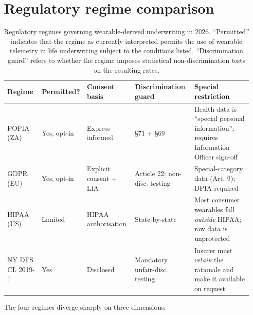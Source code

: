 \documentclass[11pt,a4paper]{article}
\let\origsection\section
\renewcommand{\section}{\clearpage\origsection}
\theoremstyle{ia}
\newcommand{\1}{\mathbf{1}}
\begin{document}
\section{Regulatory regime comparison}\label{sec:regulatory}

\begin{table}[ht]
\centering\footnotesize
\caption{Regulatory regimes governing wearable-derived underwriting
in 2026. ``Permitted'' indicates that the regime as currently
interpreted permits the use of wearable telemetry in life
underwriting subject to the conditions listed. ``Discrimination
guard'' refers to whether the regime imposes statistical
non-discrimination tests on the resulting rates.}\label{tab:regulatory}
\setlength{\tabcolsep}{4pt}
\begin{tabular}{p{2.4cm}p{2.4cm}p{2.4cm}p{2.4cm}p{3.0cm}}
\toprule
Regime & Permitted? & Consent basis & Discrimination guard & Special restriction \\
\midrule
POPIA (ZA)         & Yes, opt-in    & Express informed
                                    & §71 + §69
                                    & Health data is ``special personal information'';
                                      requires Information Officer sign-off \\
GDPR (EU)          & Yes, opt-in    & Explicit consent + LIA
                                    & Article 22; non-disc. testing
                                    & Special-category data (Art. 9);
                                      DPIA required \\
HIPAA (US)         & Limited        & HIPAA authorisation
                                    & State-by-state
                                    & Most consumer wearables fall \emph{outside} HIPAA;
                                      raw data is unprotected \\
NY DFS CL 2019-1   & Yes            & Disclosed
                                    & Mandatory unfair-disc. testing
                                    & Insurer must \emph{retain} the rationale
                                      and make it available on request \\
\bottomrule
\end{tabular}
\end{table}

The four regimes diverge sharply on three dimensions:
\end{document}
